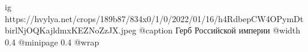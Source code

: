  
 
 
 
 

\ifcmt
  ig https://hvylya.net/crops/189b87/834x0/1/0/2022/01/16/h4RdbepCW4OPymDtbirlNjOQKajldmxKEZNoZzJX.jpeg
  @caption Герб Российской империи
  @width 0.4
  @minipage 0.4
  @wrap \parpic[r]
\fi
